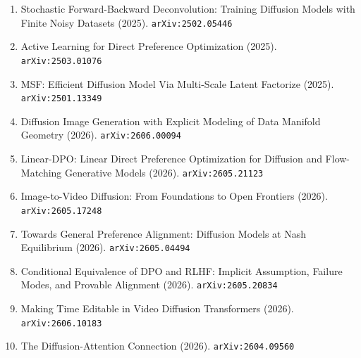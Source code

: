 \documentclass[11pt]{article}
\begin{document}
\begin{enumerate}
  \item Stochastic Forward-Backward Deconvolution: Training Diffusion Models with Finite Noisy Datasets (2025). \texttt{arXiv:2502.05446}
  \item Active Learning for Direct Preference Optimization (2025). \texttt{arXiv:2503.01076}
  \item MSF: Efficient Diffusion Model Via Multi-Scale Latent Factorize (2025). \texttt{arXiv:2501.13349}
  \item Diffusion Image Generation with Explicit Modeling of Data Manifold Geometry (2026). \texttt{arXiv:2606.00094}
  \item Linear-DPO: Linear Direct Preference Optimization for Diffusion and Flow-Matching Generative Models (2026). \texttt{arXiv:2605.21123}
  \item Image-to-Video Diffusion: From Foundations to Open Frontiers (2026). \texttt{arXiv:2605.17248}
  \item Towards General Preference Alignment: Diffusion Models at Nash Equilibrium (2026). \texttt{arXiv:2605.04494}
  \item Conditional Equivalence of DPO and RLHF: Implicit Assumption, Failure Modes, and Provable Alignment (2026). \texttt{arXiv:2605.20834}
  \item Making Time Editable in Video Diffusion Transformers (2026). \texttt{arXiv:2606.10183}
  \item The Diffusion-Attention Connection (2026). \texttt{arXiv:2604.09560}
\end{enumerate}
\end{document}
